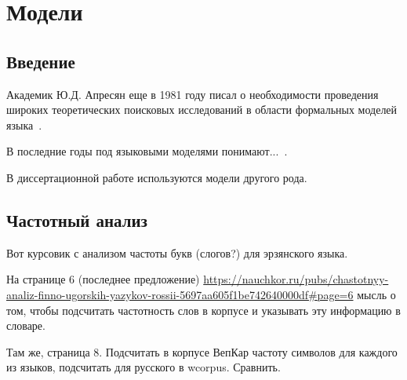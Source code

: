 \chapter{Модели} \label{chapt_models}

\section{Введение} \label{sect_model_intro}
Академик Ю.Д. Апресян еще в 1981 году писал о необходимости проведения широких теоретических поисковых исследований в области формальных моделей языка~\cite{Apresjan1981}.

В последние годы под языковыми моделями понимают...~\cite{Petroni2019}. 

В диссертационной работе используются модели другого рода.

\section{Частотный анализ} \label{sect_ideas_1}


Вот курсовик с анализом частоты букв (слогов?) для эрзянского языка.

На странице 6 (последнее предложение)
\url{https://nauchkor.ru/pubs/chastotnyy-analiz-finno-ugorskih-yazykov-rossii-5697aa605f1be742640000df#page=6}
мысль о том, чтобы подсчитать частотность слов в корпусе и указывать эту информацию в словаре.

Там же, страница 8. Подсчитать в корпусе ВепКар частоту символов для каждого из языков, 
подсчитать для русского в wcorpus. Сравнить.



